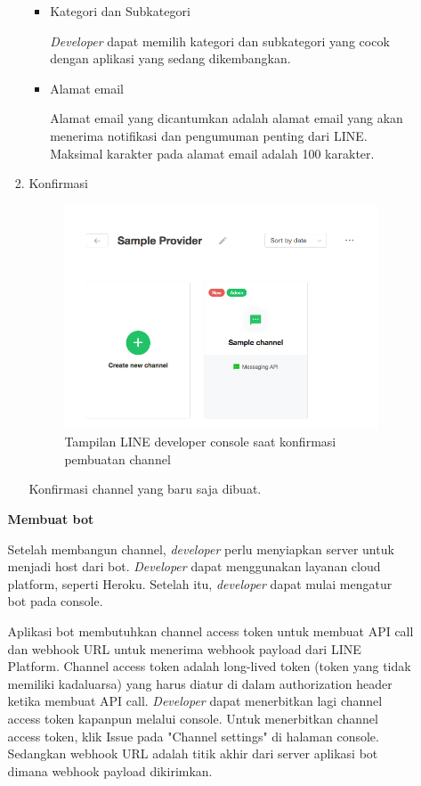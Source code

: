 \documentclass[a4paper,twoside]{article}
\begin{document}
\begin{enumerate}
\begin{enumerate}
\begin{enumerate}
\begin{itemize}
\item Kategori dan Subkategori

\textit{Developer} dapat memilih kategori dan subkategori yang cocok dengan aplikasi yang sedang dikembangkan.

\item Alamat email

Alamat email yang dicantumkan adalah alamat email yang akan menerima notifikasi dan pengumuman penting dari LINE. Maksimal karakter pada alamat email adalah 100 karakter.

\end{itemize}

\item Konfirmasi
\begin{figure}[H]
	\centering  
	\includegraphics[scale=0.4]{Gambar/line-developers-console-confirm-channel.png}  
	\caption[Tampilan LINE developer console saat konfirmasi pembuatan channel]{Tampilan LINE developer console saat konfirmasi pembuatan channel} 
	\label{fig:line-developers-console-confirm-channel} 
\end{figure}

Konfirmasi channel yang baru saja dibuat.

\end{enumerate}


\textbf{Membuat bot}

Setelah membangun channel, \textit{developer} perlu menyiapkan server untuk menjadi host dari bot. \textit{Developer} dapat menggunakan layanan cloud platform, seperti Heroku. Setelah itu, \textit{developer} dapat mulai mengatur bot pada console.

Aplikasi bot membutuhkan channel access token untuk membuat API call dan webhook URL untuk menerima webhook payload dari LINE Platform. Channel access token adalah long-lived token (token yang tidak memiliki kadaluarsa) yang harus diatur di dalam authorization header ketika membuat API call. \textit{Developer} dapat menerbitkan lagi channel access token kapanpun melalui console. Untuk menerbitkan channel access token, klik Issue pada "Channel settings" di halaman console. Sedangkan webhook URL adalah titik akhir dari server aplikasi bot dimana webhook payload dikirimkan.


\end{enumerate}
\end{enumerate}
\end{document}
